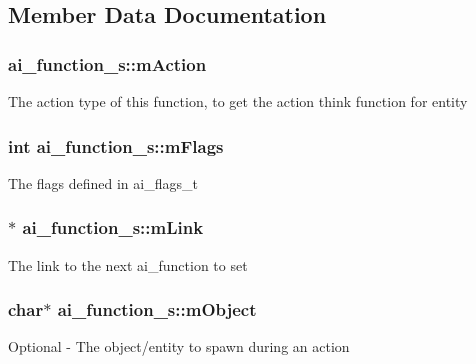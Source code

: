 \subsection{Member Data Documentation}
\subsubsection[{\texorpdfstring{m\+Action}{mAction}}]{ ai\+\_\+function\+\_\+s\+::m\+Action}\hypertarget{structai__function__s_af4d9b08ccfe717ad1ce41234e83e31f0}{}\label{structai__function__s_af4d9b08ccfe717ad1ce41234e83e31f0}
The action type of this function, to get the action think function for entity 
\subsubsection[{\texorpdfstring{m\+Flags}{mFlags}}]{\setlength{\rightskip}{0pt plus 5cm}int ai\+\_\+function\+\_\+s\+::m\+Flags}\hypertarget{structai__function__s_a6b557bb606ab18dca509b783011bd94e}{}\label{structai__function__s_a6b557bb606ab18dca509b783011bd94e}
The flags defined in ai\+\_\+flags\+\_\+t 
\subsubsection[{\texorpdfstring{m\+Link}{mLink}}]{$\ast$ ai\+\_\+function\+\_\+s\+::m\+Link}\hypertarget{structai__function__s_ae9b7b8987b3ebbb9bcd8298b14b37ea3}{}\label{structai__function__s_ae9b7b8987b3ebbb9bcd8298b14b37ea3}
The link to the next ai\+\_\+function to set 
\subsubsection[{\texorpdfstring{m\+Object}{mObject}}]{\setlength{\rightskip}{0pt plus 5cm}char$\ast$ ai\+\_\+function\+\_\+s\+::m\+Object}\hypertarget{structai__function__s_a3d82a5e9fd73222757928edd103e34b2}{}\label{structai__function__s_a3d82a5e9fd73222757928edd103e34b2}
Optional -\/ The object/entity to spawn during an action 
